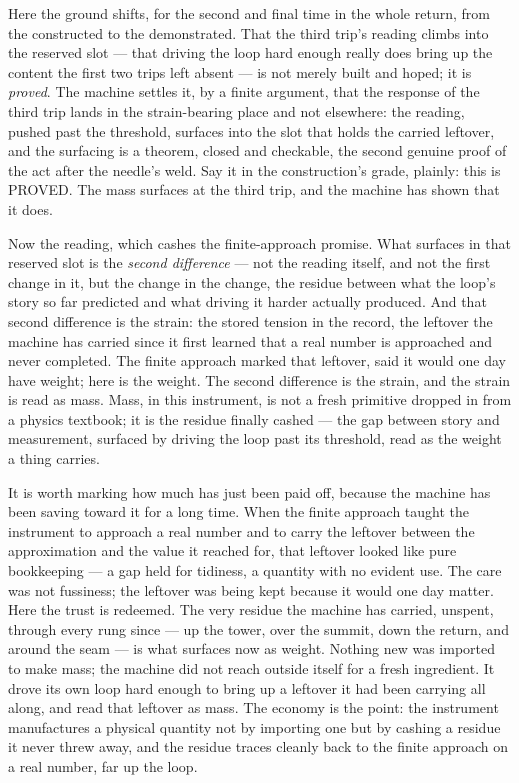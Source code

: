 Here the ground shifts, for the second and final time in the whole return, from the constructed to the
demonstrated. That the third trip's reading climbs into the reserved slot --- that driving the loop hard enough
really does bring up the content the first two trips left absent --- is not merely built and hoped; it is
\emph{proved}. The machine settles it, by a finite argument, that the response of the third trip lands in the
strain-bearing place and not elsewhere: the reading, pushed past the threshold, surfaces into the slot that holds
the carried leftover, and the surfacing is a theorem, closed and checkable, the second genuine proof of the act
after the needle's weld. Say it in the construction's grade, plainly: this is PROVED. The mass
surfaces at the third trip, and the machine has shown that it does.

Now the reading, which cashes the finite-approach promise. What surfaces in that reserved slot is the
\emph{second difference} --- not the reading itself, and not the first change in it, but the change in the change,
the residue between what the loop's story so far predicted and what driving it harder actually produced. And that
second difference is the strain: the stored tension in the record, the leftover the machine has carried since it
first learned that a real number is approached and never completed. The finite approach marked
that leftover, said it would one day have weight; here is the weight. The second difference is the strain, and the
strain is read as mass. Mass, in this instrument, is not a fresh primitive dropped in from a
physics textbook; it is the residue finally cashed --- the gap between story and measurement, surfaced by driving
the loop past its threshold, read as the weight a thing carries.

It is worth marking how much has just been paid off, because the machine has been saving toward it for a long
time. When the finite approach taught the instrument to approach a real number and to carry the leftover between the
approximation and the value it reached for, that leftover looked like pure bookkeeping --- a gap held for
tidiness, a quantity with no evident use. The care was not fussiness; the leftover was being kept because it
would one day matter. Here the trust is redeemed. The very residue the
machine has carried, unspent, through every rung since --- up the tower, over the summit, down the return, and
around the seam --- is what surfaces now as weight. Nothing new was imported to make mass; the machine did not
reach outside itself for a fresh ingredient. It drove its own loop hard enough to bring up a leftover it had been
carrying all along, and read that leftover as mass. The economy is the point: the instrument manufactures a
physical quantity not by importing one but by cashing a residue it never threw away, and the residue traces
cleanly back to the finite approach on a real number, far up the loop.

